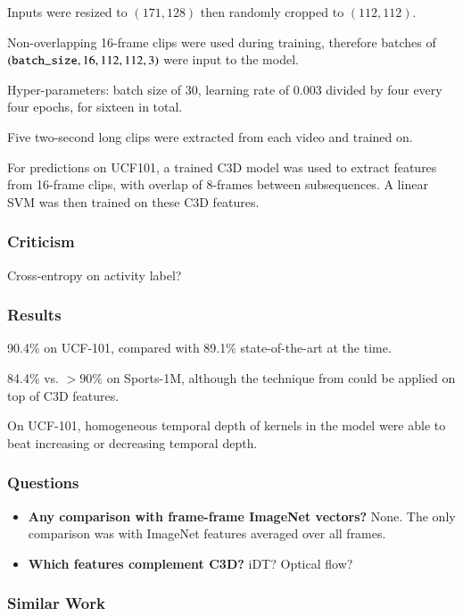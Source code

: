 \documentclass[a4paper, 12pt]{article}
\begin{document}
Inputs were resized to $(171, 128)$ then randomly cropped to $(112, 112)$.

Non-overlapping 16-frame clips were used during training, therefore batches of
$(\verb|batch_size|, 16, 112, 112, 3)$ were input to the model.

Hyper-parameters: batch size of 30, learning rate of 0.003 divided by four
every four epochs, for sixteen in total.

Five two-second long clips were extracted from each video and trained on.

For predictions on UCF101, a trained C3D model was used to extract features
from 16-frame clips, with overlap of 8-frames between subsequences. A linear
SVM was then trained on these C3D features.

\subsubsection{Criticism}

Cross-entropy on activity label?

\subsubsection{Results}

90.4\% on UCF-101, compared with 89.1\% state-of-the-art at the time.

84.4\% vs. $> 90\%$ on Sports-1M, although the technique
from\citet{DBLP:journals/corr/NgHVVMT15} could be applied on top of C3D
features.

On UCF-101, homogeneous temporal depth of kernels in the model were able to
beat increasing or decreasing temporal depth.

\subsubsection{Questions}

\begin{itemize}
\item \textbf{Any comparison with frame-frame ImageNet vectors?} None. The only
        comparison was with ImageNet features averaged over all frames.

\item \textbf{Which features complement C3D?} iDT\@? Optical flow?
\end{itemize}

\subsubsection{Similar Work}
\end{document}
